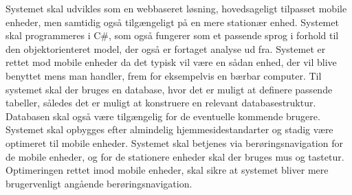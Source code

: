 Systemet skal udvikles som en webbaseret løsning, hovedsageligt tilpasset mobile enheder, men samtidig også tilgængeligt på en mere stationær enhed. Systemet skal programmeres i C\#, som også fungerer som et passende sprog i forhold til den objektorienteret model, der også er fortaget analyse ud fra. Systemet er rettet mod mobile enheder da det typisk vil være en sådan enhed, der vil blive benyttet mens man handler, frem for eksempelvis en bærbar computer.
Til systemet skal der bruges en database, hvor det er muligt at definere passende tabeller, således det er muligt at konstruere en relevant databasestruktur. Databasen skal også være tilgængelig for de eventuelle kommende brugere. 
Systemet skal opbygges efter almindelig hjemmesidestandarter og stadig være optimeret til mobile enheder.
Systemet skal betjenes via berøringsnavigation for de mobile enheder, og for de stationere enheder skal der bruges mus og tastetur.
Optimeringen rettet imod mobile enheder, skal sikre at systemet bliver mere brugervenligt angående berøringsnavigation.
